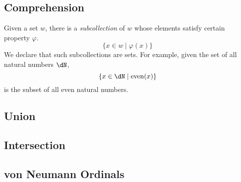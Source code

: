 \documentclass{amsart}
\begin{document}
\subsection{Comprehension}
\label{sec:comprehension}

Given a set $w$, there is a \emph{subcollection} of $w$ whose elements satisfy certain property $\varphi$.
\[
  \{ x \in w \mid \varphi(x) \}
\]
We declare that such subcollections are sets.
For example, given the set of all natural numbers $\dN$,
\[
  \{ x \in \dN \mid \mathrm{even}(x) \}
\]
is the subset of all even natural numbers.

\subsection{Union}
\label{sec:union}

\subsection{Intersection}
\label{sec:intersection}

\subsection{von Neumann Ordinals}
\label{sec:von-neumann-ordinals}
\end{document}
